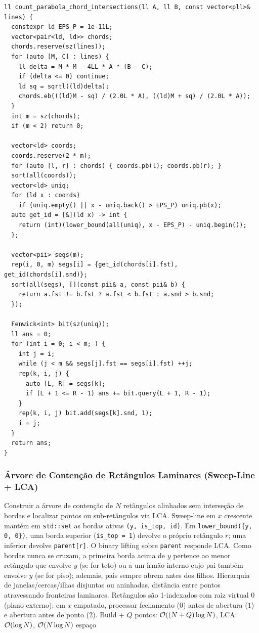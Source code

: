 \begin{lstlisting}
ll count_parabola_chord_intersections(ll A, ll B, const vector<pll>& lines) {
  constexpr ld EPS_P = 1e-11L;
  vector<pair<ld, ld>> chords;
  chords.reserve(sz(lines));
  for (auto [M, C] : lines) {
    ll delta = M * M - 4LL * A * (B - C);
    if (delta <= 0) continue;
    ld sq = sqrtl((ld)delta);
    chords.eb(((ld)M - sq) / (2.0L * A), ((ld)M + sq) / (2.0L * A));
  }
  int m = sz(chords);
  if (m < 2) return 0;

  vector<ld> coords;
  coords.reserve(2 * m);
  for (auto [l, r] : chords) { coords.pb(l); coords.pb(r); }
  sort(all(coords));
  vector<ld> uniq;
  for (ld x : coords)
    if (uniq.empty() || x - uniq.back() > EPS_P) uniq.pb(x);
  auto get_id = [&](ld x) -> int {
    return (int)(lower_bound(all(uniq), x - EPS_P) - uniq.begin());
  };

  vector<pii> segs(m);
  rep(i, 0, m) segs[i] = {get_id(chords[i].fst), get_id(chords[i].snd)};
  sort(all(segs), [](const pii& a, const pii& b) {
    return a.fst != b.fst ? a.fst < b.fst : a.snd > b.snd;
  });

  Fenwick<int> bit(sz(uniq));
  ll ans = 0;
  for (int i = 0; i < m; ) {
    int j = i;
    while (j < m && segs[j].fst == segs[i].fst) ++j;
    rep(k, i, j) {
      auto [L, R] = segs[k];
      if (L + 1 <= R - 1) ans += bit.query(L + 1, R - 1);
    }
    rep(k, i, j) bit.add(segs[k].snd, 1);
    i = j;
  }
  return ans;
}
\end{lstlisting}

\subsubsection{Árvore de Contenção de Retângulos Laminares (Sweep-Line + LCA)}
\algobox
  {Construir a árvore de contenção de $N$ retângulos alinhados sem interseção de bordas e localizar pontos ou sub-retângulos via LCA.}
  {Sweep-line em $x$ crescente mantém em \texttt{std::set} as bordas ativas \texttt{(y, is\_top, id)}. Em \texttt{lower\_bound(\{y, 0, 0\})}, uma borda superior (\texttt{is\_top = 1}) devolve o próprio retângulo $r$; uma inferior devolve \texttt{parent[r]}. O binary lifting sobre \texttt{parent} responde LCA.}
  {Como bordas nunca se cruzam, a primeira borda acima de $y$ pertence ao menor retângulo que envolve $y$ (se for teto) ou a um irmão interno cujo pai também envolve $y$ (se for piso); ademais, pais sempre abrem antes dos filhos.}
  {Hierarquia de janelas/cercas/ilhas disjuntas ou aninhadas, distância entre pontos atravessando fronteiras laminares.}
  {Retângulos são 1-indexados com raiz virtual $0$ (plano externo); em $x$ empatado, processar fechamento ($0$) antes de abertura ($1$) e abertura antes de ponto ($2$).}
  {Build + $Q$ pontos: $\mathcal{O}((N + Q) \log N)$, LCA: $\mathcal{O}(\log N)$, $\mathcal{O}(N \log N)$ espaço}

